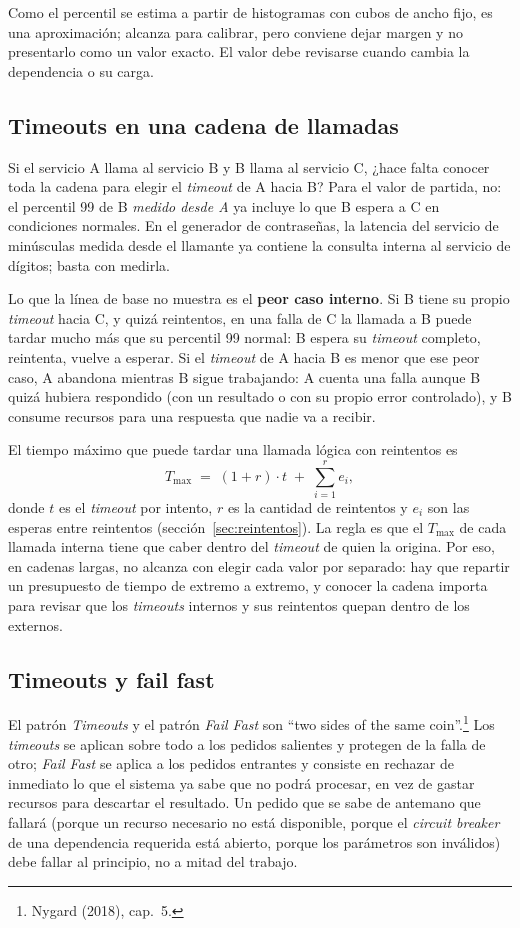 \documentclass[variant=apuntes,cover=institutional,mode=screen]{ua-engineering-v6-article}
\begin{document}
Como el percentil se estima a partir de histogramas con cubos de ancho fijo, es una aproximación; alcanza para calibrar, pero conviene dejar margen y no presentarlo como un valor exacto. El valor debe revisarse cuando cambia la dependencia o su carga.

\subsection{Timeouts en una cadena de llamadas}

Si el servicio A llama al servicio B y B llama al servicio C, ¿hace falta conocer toda la cadena para elegir el \emph{timeout} de A hacia B? Para el valor de partida, no: el percentil 99 de B \emph{medido desde A} ya incluye lo que B espera a C en condiciones normales. En el generador de contraseñas, la latencia del servicio de minúsculas medida desde el llamante ya contiene la consulta interna al servicio de dígitos; basta con medirla.

Lo que la línea de base no muestra es el \textbf{peor caso interno}. Si B tiene su propio \emph{timeout} hacia C, y quizá reintentos, en una falla de C la llamada a B puede tardar mucho más que su percentil 99 normal: B espera su \emph{timeout} completo, reintenta, vuelve a esperar. Si el \emph{timeout} de A hacia B es menor que ese peor caso, A abandona mientras B sigue trabajando: A cuenta una falla aunque B quizá hubiera respondido (con un resultado o con su propio error controlado), y B consume recursos para una respuesta que nadie va a recibir.

El tiempo máximo que puede tardar una llamada lógica con reintentos es
\[
T_{\max} \;=\; (1 + r)\cdot t \;+\; \sum_{i=1}^{r} e_i,
\]
donde $t$ es el \emph{timeout} por intento, $r$ es la cantidad de reintentos y $e_i$ son las esperas entre reintentos (sección~\ref{sec:reintentos}). La regla es que el $T_{\max}$ de cada llamada interna tiene que caber dentro del \emph{timeout} de quien la origina. Por eso, en cadenas largas, no alcanza con elegir cada valor por separado: hay que repartir un presupuesto de tiempo de extremo a extremo, y conocer la cadena importa para revisar que los \emph{timeouts} internos y sus reintentos quepan dentro de los externos.

\subsection{Timeouts y fail fast}

El patrón \emph{Timeouts} y el patrón \emph{Fail Fast} son ``two sides of the same coin''.\footnote{Nygard (2018), cap.~5.} Los \emph{timeouts} se aplican sobre todo a los pedidos salientes y protegen de la falla de otro; \emph{Fail Fast} se aplica a los pedidos entrantes y consiste en rechazar de inmediato lo que el sistema ya sabe que no podrá procesar, en vez de gastar recursos para descartar el resultado. Un pedido que se sabe de antemano que fallará (porque un recurso necesario no está disponible, porque el \emph{circuit breaker} de una dependencia requerida está abierto, porque los parámetros son inválidos) debe fallar al principio, no a mitad del trabajo.
\end{document}
